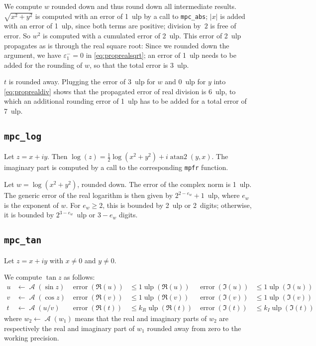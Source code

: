 \documentclass {article}
\newcommand {\mpfr}{{\tt mpfr}}
\newcommand {\ulp}[1]{#1~ulp}
\newcommand {\Ulp}{{\operatorname {ulp}}}
\newcommand {\atantwo}{\operatorname {atan2}}
\newcommand{\error}{\operatorname {error}}
\DeclareMathOperator{\A}{\mathcal A}
\renewcommand {\epsilon}{\varepsilon}
\renewcommand {\leq}{\leqslant}
\renewcommand {\geq}{\geqslant}
\begin{document}
We compute $w$ rounded down and thus round down all intermediate results.
$\sqrt {x^2 + y^2}$ is computed with an error of \ulp{1}
by a call to \texttt {mpc\_abs}; $|x|$ is added with an error of \ulp{1},
since both terms are positive; division by~$2$ is free of error. So
$w^2$ is computed with a cumulated error of \ulp{2}.
This error of \ulp{2} propagates as is through the real square root:
Since we rounded down the argument, we have $\epsilon_1^- = 0$ in
\eqref {eq:proprealsqrt}; an error of \ulp{1} needs to be added for the
rounding of $w$, so that the total error is \ulp{3}.

$t$ is rounded away. Plugging the error of \ulp{3} for $w$ and \ulp{0} for $y$ into
\eqref {eq:proprealdiv} shows that the propagated error of real division is
\ulp{6}, to which an additional rounding error of \ulp{1} has to be added
for a total error of \ulp{7}.


\subsection {\texttt {mpc\_log}}

Let $z = x + i y$. Then $\log (z) = \frac {1}{2} \log (x^2 + y^2) + i \atantwo (y, x)$. The imaginary part is computed by a call to the corresponding {\mpfr} function.

Let $w = \log (x^2 + y^2)$, rounded down. The error of the complex norm is \ulp{1}. The generic error of the real logarithm is then given by \ulp{$2^{2 - e_w} + 1$}, where $e_w$ is the exponent of $w$. For $e_w \geq 2$, this is bounded by \ulp{2} or 2~digits; otherwise, it is bounded by \ulp{$2^{3 - e_w}$} or $3 - e_w$ digits.

\subsection {\texttt {mpc\_tan}}

Let $z = x + i y$ with $x \neq 0$ and $y \neq 0$.

We compute $\tan z$ as follows:
\begin{align*}
u &\leftarrow \A(\sin z) &\error(\Re(u)) &\leq 1 \Ulp(\Re(u))
&\error(\Im(u)) &\leq 1 \Ulp(\Im(u))
\\
v &\leftarrow \A(\cos z) &\error(\Re(v)) &\leq 1 \Ulp(\Re(v))
&\error(\Im(v)) &\leq 1 \Ulp(\Im(v))
\\
t &\leftarrow \A(u/v) &\error(\Re(t)) &\leq k_R \Ulp(\Re(t))
&\error(\Im(t)) &\leq k_I \Ulp(\Im(t))
\end{align*}
where $w_2 \leftarrow \A(w_1)$ means that the real and imaginary parts of
$w_2$ are respectively the real and imaginary part of $w_1$ rounded away from
zero to the working precision.
\end{document}

